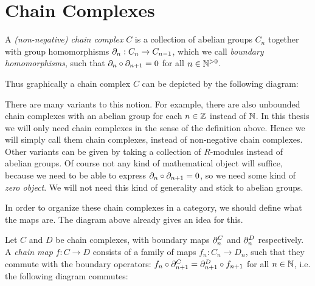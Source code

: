 \section{Chain Complexes}
\label{sec:Chain Complexes}
\begin{definition}
	A \emph{(non-negative) chain complex} $C$ is a collection of abelian groups $C_n$ together with group homomorphisms $\partial_n: C_n \to C_{n-1}$, which we call \emph{boundary homomorphisms}, such that $\partial_n \circ \partial_{n+1} = 0$ for all $n \in {\mathbb{N}^{>0}}$.
\end{definition}

Thus graphically a chain complex $C$ can be depicted by the following diagram:
\begin{center}
\end{center}

There are many variants to this notion. For example, there are also unbounded chain complexes with an abelian group for each $n \in \mathbb{Z}$ instead of $\mathbb{N}$. In this thesis we will only need chain complexes in the sense of the definition above. Hence we will simply call them chain complexes, instead of non-negative chain complexes. Other variants can be given by taking a collection of $R$-modules instead of abelian groups. Of course not any kind of mathematical object will suffice, because we need to be able to express $\partial_n \circ \partial_{n+1} = 0$, so we need some kind of \emph{zero object}. We will not need this kind of generality and stick to abelian groups.

In order to organize these chain complexes in a category, we should define what the maps are. The diagram above already gives an idea for this.
\begin{definition}
	Let $C$ and $D$ be chain complexes, with boundary maps $\partial^C_n$ and $\partial^D_n$ respectively. A \emph{chain map} $f: C \to D$ consists of a family of maps $f_n: C_n \to D_n$, such that they commute with the boundary operators: $f_n \circ \partial^C_{n+1} = \partial^D_{n+1} \circ f_{n+1}$ for all $n \in \mathbb{N}$, i.e. the following diagram commutes:
	\begin{center}
	\end{center}
\end{definition}

